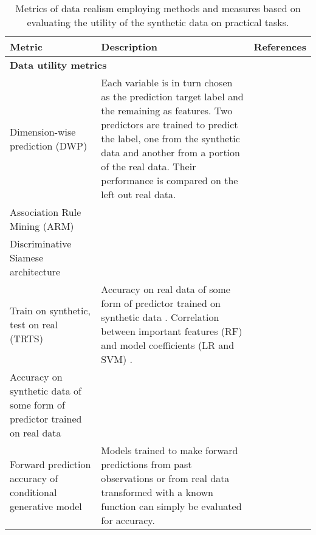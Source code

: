 \begin{table}[htpb]
        
        
        \caption{Metrics of data realism employing methods and measures based on evaluating the utility of the synthetic data on practical tasks.}\label{tab:aug-metrics}
        
        \begin{tabular}{@{} p{} p{} p{} @{}} \toprule
        Metric & Description & References\\ \midrule
        
        \multicolumn{3}{Y}{\textbf{Data utility metrics}}\\ \midrule
        
        Dimension-wise prediction (DWP) & Each variable is in turn chosen as the prediction target label and the remaining as features. Two predictors are trained to predict the label, one from the synthetic data and another from a portion of the real data. Their performance is compared on the left out real data.  & \cite{choi2017generating,Camino2018-re,Goncalves2020,yan2020generating}\\[20pt]
        
        Association Rule Mining (ARM) & & \cite{Baowaly2019,Bae2020,yan2020generating}\\[20pt]
        
        Discriminative Siamese architecture & & \cite{torfi2019generating}\\[20pt]
        
        Train on synthetic, test on real (TRTS) & Accuracy on real data of some form of predictor trained on synthetic data \cite{Beaulieu-Jones2019-ct}. Correlation between important features (RF) and model coefficients (LR and SVM) \cite{Beaulieu-Jones2019-ct}. & \cite{esteban2017real,Xu2019-ay,Yoon2018-dm,chin2019generation}\\
        
        Accuracy on synthetic data of some form of predictor trained on real data & & \cite{Bae2020}\\
        
        Forward prediction accuracy of conditional generative model &
        Models trained to make forward predictions from past observations or from real data transformed with a known function can simply be evaluated for accuracy. & \cite{Xiao2018-aj,mcdermott2018semi,yoon2018gain,Yang_2019b}\\
        


\end{tabular}
\end{table}
